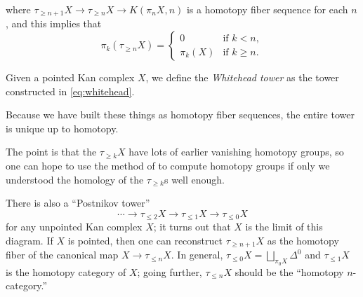 \documentclass[../notes.tex]{subfiles}
\begin{document}
where $\tau_{\ge n+1}X\to\tau_{\ge n}X\to K(\pi_nX,n)$ is a homotopy fiber sequence for each $n$, and this implies that
\[\pi_k(\tau_{\ge n}X)=\begin{cases}
	0 & \text{if }k<n, \\
	\pi_k(X) & \text{if }k\ge n.
\end{cases}\]
\begin{definition}
	Given a pointed Kan complex $X$, we define the \textit{Whitehead tower} as the tower constructed in \eqref{eq:whitehead}.
\end{definition}
\begin{remark}
	Because we have built these things as homotopy fiber sequences, the entire tower is unique up to homotopy.
\end{remark}
\begin{remark}
	The point is that the $\tau_{\ge k}X$ have lots of earlier vanishing homotopy groups, so one can hope to use the method of  to compute homotopy groups if only we understood the homology of the $\tau_{\ge k}$s well enough.
\end{remark}
\begin{remark}
	There is also a ``Postnikov tower''
	\[\cdots\to\tau_{\le2}X\to\tau_{\le1}X\to\tau_{\le0}X\]
	for any unpointed Kan complex $X$; it turns out that $X$ is the limit of this diagram. If $X$ is pointed, then one can reconstruct $\tau_{\ge n+1}X$ as the homotopy fiber of the canonical map $X\to\tau_{\le n}X$. In general, $\tau_{\le0}X=\bigsqcup_{\pi_0X}\Delta^0$ and $\tau_{\le1}X$ is the homotopy category of $X$; going further, $\tau_{\le n}X$ should be the ``homotopy $n$-category.''
\end{remark}
\end{document}
